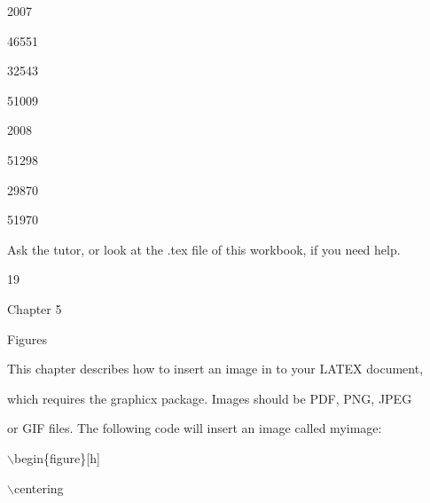 \documentclass[a4paper,portrait,12pt]{article}
\begin{document}
2007


46551


32543


51009





2008


51298


29870


51970





\begin{flushleft}
Ask the tutor, or look at the .tex file of this workbook, if you need help.
\end{flushleft}





19










\begin{flushleft}
\newpage
Chapter 5
\end{flushleft}


\begin{flushleft}
Figures
\end{flushleft}


\begin{flushleft}
This chapter describes how to insert an image in to your LATEX document,
\end{flushleft}


\begin{flushleft}
which requires the graphicx package. Images should be PDF, PNG, JPEG
\end{flushleft}


\begin{flushleft}
or GIF files. The following code will insert an image called myimage:
\end{flushleft}





\begin{flushleft}
\ensuremath{\backslash}begin\{figure\}[h]
\end{flushleft}


\begin{flushleft}
\ensuremath{\backslash}centering
\end{flushleft}
\end{document}
